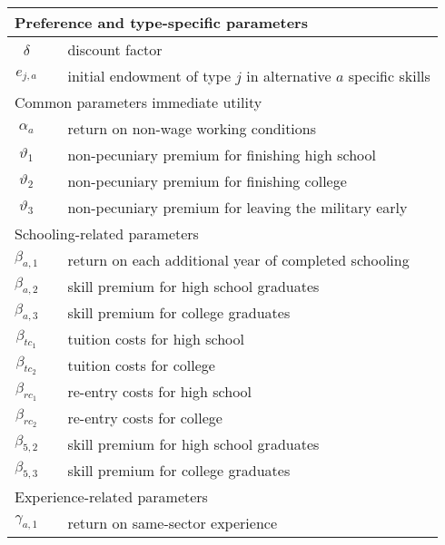 \begin{ThreePartTable}
\begin{longtable}{@{}cll@{}}
		\midrule
		\multicolumn{3}{l}{Preference and type-specific parameters}																		 \\ \midrule
		$\delta$ 				&  & discount factor																			  \\
		$e_{j, a}$			&  & initial endowment of type $j$ in alternative $a$ specific skills 	  \\ [7.5pt] \midrule
		\multicolumn{3}{l}{Common parameters immediate utility}												\\ \midrule
		$\alpha_a$           &  & return on non-wage working conditions		   \\
		$\vartheta_1$        &  & non-pecuniary premium for finishing high school                 								    \\
		$\vartheta_2$        &  & non-pecuniary premium for finishing college															    \\
		$\vartheta_3$        &  & non-pecuniary premium for leaving the military early						  \\[7.5pt] \midrule
		\multicolumn{3}{l}{Schooling-related parameters}															   \\ \midrule
		$\beta_{a,1}$        &  & return on each additional year of completed schooling 								\\
		$\beta_{a,2}$        &  & skill premium for high school graduates										      \\
		$\beta_{a,3}$        &  & skill premium for college graduates													   	\\
		$\beta_{tc_1}$       &  & tuition costs for high school                      											\\
		$\beta_{tc_2}$       &  & tuition costs for college                          												\\
		$\beta_{rc_1}$       &  & re-entry costs for high school                     										   \\
		$\beta_{rc_2}$       &  & re-entry costs for college                        												   \\
		$\beta_{5,2}$        &  & skill premium for high school graduates            									\\
		$\beta_{5,3}$        &  & skill premium for college graduates                									     \\ [7.5pt] \midrule
		\multicolumn{3}{l}{Experience-related parameters}           													 \\
		\midrule
		$\gamma_{a,1}$       &  & return on same-sector experience                 									 \\

\end{longtable}
\end{ThreePartTable}
